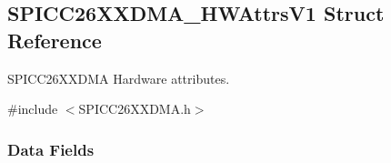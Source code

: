 \subsection{S\+P\+I\+C\+C26\+X\+X\+D\+M\+A\+\_\+\+H\+W\+Attrs\+V1 Struct Reference}
\label{struct_s_p_i_c_c26_x_x_d_m_a___h_w_attrs_v1}


S\+P\+I\+C\+C26\+X\+X\+D\+M\+A Hardware attributes.  




{\ttfamily \#include $<$S\+P\+I\+C\+C26\+X\+X\+D\+M\+A.\+h$>$}

\subsubsection*{Data Fields}
